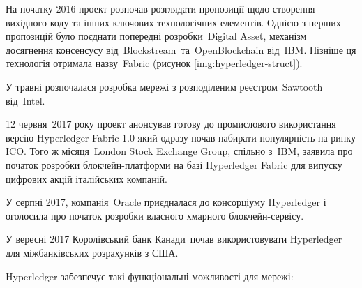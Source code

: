 \documentclass{lib/styles/default-style}
\begin{document}
    На початку 2016 проект розпочав розглядати пропозиції щодо створення вихідного коду
    та інших ключових технологічних елементів. Однією з перших пропозицій було поєднати попередні розробки Digital Asset,
    механізм досягнення консенсусу від Blockstream та OpenBlockchain від IBM. Пізніше ця технологія отримала назву Fabric (рисунок \ref{img:hyperledger-struct}).
    

    У травні розпочалася розробка мережі з розподіленим реєстром Sawtooth від Intel. 

    12 червня 2017 року проект анонсував готову до промислового використання версію Hyperledger Fabric 1.0 який одразу 
    почав набирати популярність на ринку ICO. Того ж місяця London Stock Exchange Group, спільно з IBM, заявила про початок
    розробки блокчейн-платформи на базі Hyperledger Fabric для випуску цифрових акцій італійських компаній. 
    
    У серпні 2017, компанія Oracle приєдналася до консорціуму Hyperledger і  оголосила про початок розробки власного хмарного блокчейн-сервісу. 
    
    У вересні 2017 Королівський банк Канади почав використовувати Hyperledger для міжбанківських розрахунків з США. 
   
    Hyperledger забезпечує такі функціональні можливості для мережі:
    
\end{document}
